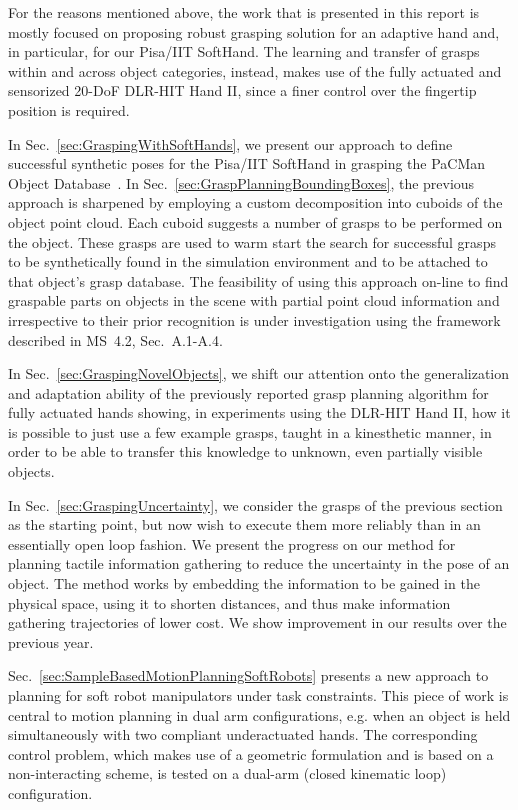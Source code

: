 \documentclass[a4paper,11pt,pdf]{pacmanreport}
\begin{document}
For the reasons mentioned above, the work that is presented in this report is mostly focused on proposing robust grasping solution for an adaptive hand and, in particular, for our Pisa/IIT SoftHand. The learning and transfer of grasps within and across object categories, instead, makes use of the fully actuated and sensorized 20-DoF DLR-HIT Hand II, since a finer control over the fingertip position is required.

In Sec.~\ref{sec:GraspingWithSoftHands}, we present our approach to define successful synthetic poses for the Pisa/IIT SoftHand in grasping the PaCMan Object Database~\cite{PacmanObjectDatabase}. In Sec.~\ref{sec:GraspPlanningBoundingBoxes}, the previous approach is sharpened by employing a custom decomposition into cuboids of the object point cloud. Each cuboid suggests a number of grasps to be performed on the object. These grasps are used to warm start the search for successful grasps to be synthetically found in the simulation environment and to be attached to that object's grasp database. The feasibility of using this approach on-line to find graspable parts on objects in the scene with partial point cloud information and irrespective to their prior recognition is under investigation using the framework described in MS~4.2, Sec.~A.1-A.4.

In Sec.~\ref{sec:GraspingNovelObjects}, we shift our attention onto the generalization and adaptation ability of the previously reported grasp planning algorithm for fully actuated hands showing, in experiments using the DLR-HIT Hand II, how it is possible to just use a few example grasps, taught in a kinesthetic manner, in order to be able to transfer this knowledge to unknown, even partially visible objects.

In Sec.~\ref{sec:GraspingUncertainty}, we consider the grasps of the previous section as the starting point, but now wish to execute them more reliably than in an essentially open loop fashion. We present the progress on our method for planning tactile information gathering to reduce the uncertainty in the pose of an object. The method works by embedding the information to be gained in the physical space, using it to shorten distances, and thus make information gathering trajectories of lower cost. We show improvement in our results over the previous year.

Sec.~\ref{sec:SampleBasedMotionPlanningSoftRobots} presents a new approach to planning for soft robot manipulators under task constraints. This piece of work is central to motion planning in dual arm configurations, e.g. when an object is held simultaneously with two compliant underactuated hands. The corresponding control problem, which makes use of a geometric formulation and is based on a non-interacting scheme, is tested on a dual-arm (closed kinematic loop) configuration.
\end{document}
